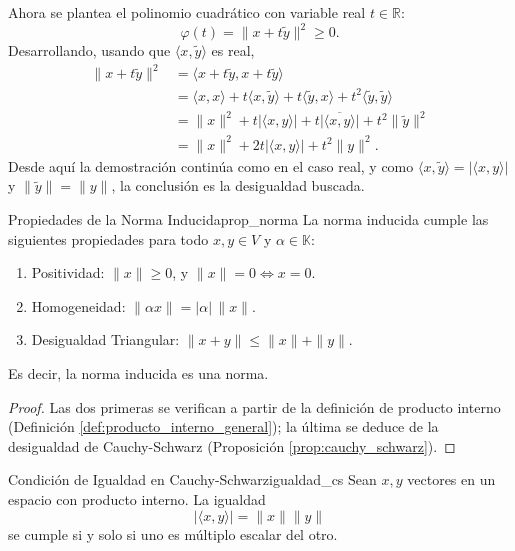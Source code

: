 \documentclass[11pt, a4paper]{article}
\begin{document}
Ahora se plantea el polinomio cuadrático con variable real $t \in \mathbb{R}$:
\[
\varphi(t) = \| x + t\tilde{y} \|^2 \ge 0.
\]
Desarrollando, usando que $\langle x, \tilde{y} \rangle$ es real,
\begin{align*}
\| x + t\tilde{y} \|^2 &= \langle x + t\tilde{y}, x + t\tilde{y} \rangle \\
&= \langle x, x \rangle + t \langle x, \tilde{y} \rangle + t \langle \tilde{y}, x \rangle + t^2 \langle \tilde{y}, \tilde{y} \rangle \\
&= \|x\|^2 + t |\langle x, y \rangle| + t \overline{|\langle x, y \rangle|} + t^2 \|\tilde{y}\|^2 \\
&= \|x\|^2 + 2t |\langle x, y \rangle| + t^2 \|y\|^2.
\end{align*}
Desde aquí la demostración continúa como en el caso real, y como $\langle x, \tilde{y} \rangle = |\langle x, y \rangle|$ y $\|\tilde{y}\| = \|y\|$, la conclusión es la desigualdad buscada.

\begin{proposicion}{Propiedades de la Norma Inducida}{prop_norma}
La norma inducida cumple las siguientes propiedades para todo $x, y \in V$ y $\alpha \in \mathbb{K}$:
\begin{enumerate}
    \item Positividad: $\|x\| \ge 0$, y $\|x\|=0 \iff x=0$.
    \item Homogeneidad: $\|\alpha x\| = |\alpha|\,\|x\|$.
    \item Desigualdad Triangular: $\|x+y\| \le \|x\| + \|y\|$.
\end{enumerate}
Es decir, la norma inducida es una norma.
\end{proposicion}

\begin{proof}
Las dos primeras se verifican a partir de la definición de producto interno (Definición \ref{def:producto_interno_general}); la última se deduce de la desigualdad de Cauchy-Schwarz (Proposición \ref{prop:cauchy_schwarz}).
\end{proof}

\begin{proposicion}{Condición de Igualdad en Cauchy-Schwarz}{igualdad_cs}
Sean $x, y$ vectores en un espacio con producto interno. La igualdad
\[
|\langle x, y \rangle| = \|x\| \|y\|
\]
se cumple si y solo si uno es múltiplo escalar del otro.
\end{proposicion}
\end{document}
